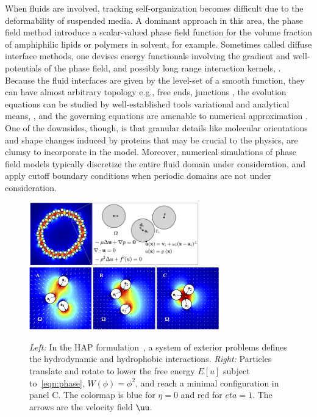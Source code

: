 When fluids are involved,
tracking self-organization
becomes difficult due to the deformability of
suspended media.  A dominant approach in this area,
the phase field method
introduce a scalar-valued phase
field function for the volume fraction of
amphiphilic lipids or polymers in solvent, for example.
Sometimes called diffuse interface
methods, one devises energy functionals involving the gradient and
well-potentials of the phase field, and possibly long range interaction
kernels, 
\cite{Promislow2022UndulatedBI,C9SM01983A,doi:10.1063/5.0009734,
LiAn-Chang16,Choksi2003OnTD}.
Because the fluid interfaces are given by the
level-set of a smooth function,
they can have almost arbitrary topology
e.g., free ends, junctions
\cite{Promislow2017ExistenceBA,Promislow2022UndulatedBI},
the evolution equations can be studied
by well-established tools variational and analytical means,
\cite{Gavish2011CurvatureDF,Dai2019WeakSF,Dai2015CompetitiveGE,
Dai2022GeometricEO,Dai2020MinimizersFT,Dai2013GeometricEO},
and the governing equations are amenable to numerical approximation
\cite{Christlieb2020BenchmarkCO,Christlieb2019CompetitionAC}.
One of the downsides, though, 
is that granular details like molecular orientations and
shape changes induced by proteins that may be crucial to the physics, are
clumsy to incorporate in the model. Moreover, numerical simulations of
phase field models typically discretize the entire fluid domain under
consideration, and apply cutoff boundary conditions when periodic
domains are not under consideration. 

\begin{figure}
  \begin{center}
    \includegraphics[keepaspectratio,height=2.7cm]{figures/SpecificAim1/Domain.jpg}
    \includegraphics[keepaspectratio,height=2.7cm]{figures/SpecificAim1/3Particles.jpg}
  \end{center}
  \caption{\label{fig:flow_map} \footnotesize {\em Left:} In the HAP
  formulation~\cite{Fu2018_SIAM}, a system of exterior problems defines
  the hydrodynamic and hydrophobic interactions. {\em Right:} Particles
  translate and rotate to lower the free energy $E[u]$ subject
  to~\eqref{eqn:phase}, $W(\phi) = \phi^2$, and reach a minimal
  configuration in panel C. The colormap is blue for $\eta = 0$ and red
  for $eta = 1$. The arrows are the velocity field $\uu$.}
\end{figure}

